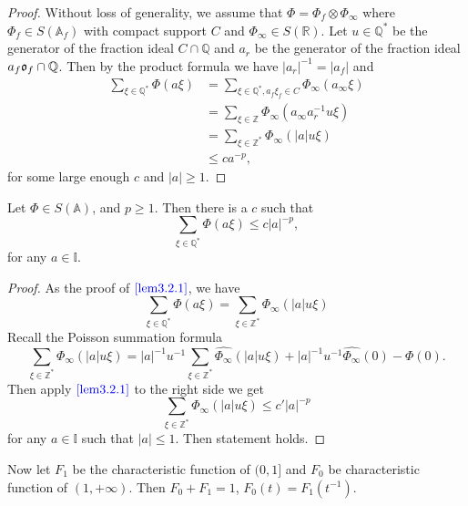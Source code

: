 \begin{proof}
Without loss of generality, we assume that $\Phi =\Phi_f \otimes \Phi_\infty$ where $\Phi_f \in S(\mathbb A_f)$ with compact support $C$ and $\Phi_\infty \in S(\mathbb R)$. 
Let $u \in \mathbb Q^*$ be the generator of the fraction ideal $C\cap \mathbb Q$ and $a_r$ be the generator of the fraction ideal $a_f\mathfrak o_f\cap \mathbb Q$. Then by the product formula we have $\left | a_r \right |^{-1} = \left | a_f \right |$ and
\begin{equation*}
    \begin{split}
	\sum\limits_ {\xi \in \mathbb Q^*} \Phi (a\xi )&= \sum\limits_{\xi\in \mathbb Q^*, a_f\xi_f\in C} \Phi _\infty (a_\infty \xi)\\
    &= \sum\limits_{\xi \in\mathbb Z} \Phi _\infty (a_\infty a_r^{-1} u \xi)\\
    &= \sum\limits_{\xi \in\mathbb Z^*} \Phi _\infty (\left | a\right | u \xi)\\
    &\le ca^{-p},
\end{split}
\end{equation*}
for some large enough $c$ and $\left |a  \right |\ge 1$.
\end{proof}

\begin{corollary}
Let $\Phi\in S(\mathbb A)$, and $p\ge 1$. Then there is a $c$ such that
\begin{equation}\label{eq3.2.4}
\sum\limits_ {\xi \in \mathbb Q^*} \Phi (a\xi )\le c\left |a\right |^{-p},  
\end{equation}
for any $a\in \mathbb I$. 
\end{corollary}

\begin{proof}
As the proof of $\textcolor{blue}{\ref{lem3.2.1}}$, we have 
\begin{equation*}
\sum\limits_ {\xi \in \mathbb Q^*} \Phi (a\xi )=\sum\limits_{\xi\in \mathbb Z^*}\Phi_\infty (\left |a\right | u\xi )
\end{equation*}
Recall the Poisson summation formula 
\[
\sum\limits_{\xi\in \mathbb Z^*}\Phi_\infty (\left |a\right | u\xi )=\left |a\right |^{-1} u^{-1}\sum\limits_{\xi\in \mathbb Z^*}\widehat {\Phi_\infty} (\left |a\right | u\xi )+\left |a\right |^{-1} u^{-1}\widehat {\Phi_\infty}(0)-\Phi(0).
\]
Then apply $\textcolor{blue}{\ref{lem3.2.1}}$ to the right side we get
\[
\sum\limits_{\xi\in \mathbb Z^*}\Phi_\infty (\left |a\right | u\xi )\le c' \left |a \right |^{-p}
\]
for any $a \in \mathbb I$ such that $\left | a \right |\le 1$. Then statement holds.
\end{proof}
Now let $F_1$ be the characteristic function of $(0,1]$ and $F_0$ be characteristic function of $(1,+\infty)$. Then $F_0+F_1=1$, $F_0(t)=F_1(t^{-1})$.

